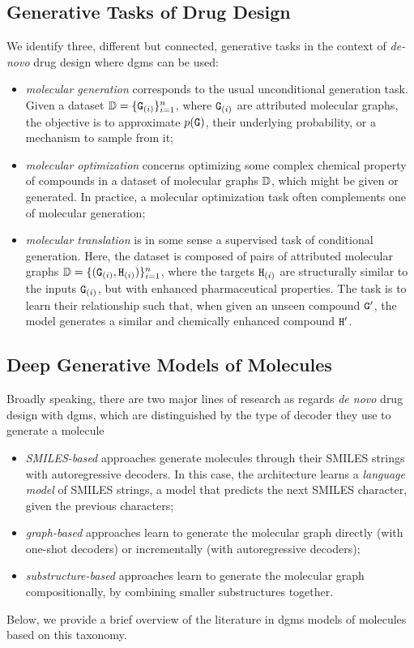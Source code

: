 \subsection{Generative Tasks of Drug Design}
We identify three, different but connected, generative tasks in the context of \emph{de-novo} drug design where \glspl{dgm} can be used:
\begin{itemize}
    \item \emph{molecular generation} corresponds to the usual unconditional generation task. Given a dataset $\Data = \{\PatternGraph{g}{i}\}_{i=1}^n$, where $\PatternGraph{g}{i}$ are attributed molecular graphs, the objective is to approximate $p(\mathtt{G})$, their underlying probability, or a mechanism to sample from it;
    \item \emph{molecular optimization} concerns optimizing some complex chemical property of compounds in a dataset of molecular graphs $\mathbb{D}$, which might be given or generated. In practice, a molecular optimization task often complements one of molecular generation;
    \item \emph{molecular translation} is in some sense a supervised task of conditional generation. Here, the dataset is composed of pairs of attributed molecular graphs $\Data = \{(\PatternGraph{g}{i}, \PatternGraph{h}{i})\}_{i=1}^n$, where the targets $\PatternGraph{h}{i}$ are structurally similar to the inputs $\PatternGraph{g}{i}$, but with enhanced pharmaceutical properties. The task is to learn their relationship such that, when given an unseen compound $\mathtt{G'}$, the model generates a similar and chemically enhanced compound $\mathtt{H'}$.
\end{itemize}

\subsection{Deep Generative Models of Molecules} \label{sec:review}
Broadly speaking, there are two major lines of research as regards \emph{de novo} drug design with \glspl{dgm}, which are distinguished by the type of decoder they use to generate a molecule
\begin{itemize}
    \item \emph{SMILES-based} approaches generate molecules through their SMILES strings with autoregressive decoders. In this case, the architecture learns a \emph{language model} of SMILES strings, \ie a model that predicts the next SMILES character, given the previous characters;
    \item \emph{graph-based} approaches learn to generate the molecular graph directly (with one-shot decoders) or incrementally (with autoregressive decoders);
    \item \emph{substructure-based} approaches learn to generate the molecular graph compositionally, by combining smaller substructures together.
\end{itemize}
Below, we provide a brief overview of the literature in \glspl{dgm} models of molecules based on this taxonomy.

